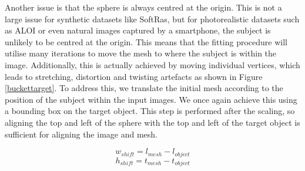 \documentclass{article}
\begin{document}
Another issue is that the sphere is always centred at the origin. This is not a large issue for synthetic datasets like SoftRas, but for photorealistic datasets such as ALOI or even natural images captured by a smartphone, the subject is unlikely to be centred at the origin. This means that the fitting procedure will utilise many iterations to move the mesh to where the subject is within the image. Additionally, this is actually achieved by moving individual vertices, which leads to stretching, distortion and twisting artefacts as shown in Figure \ref{buckettarget}. To address this, we translate the initial mesh according to the position of the subject within the input images. We once again achieve this using a bounding box on the target object. This step is performed after the scaling, so aligning the top and left of the sphere with the top and left of the target object is sufficient for aligning the image and mesh.

\[w_{shift} = l_{mesh} - l_{object}\]
\[h_{shift} = t_{mesh} - t_{object}\]
\end{document}
